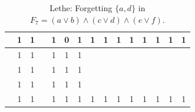 \begin{table}[!tb]
\begin{tabular}{|c|c|c|c|c|c|c|c|c|c|c|c|c|c|c|}
        \rowcolor{yellow!40}  & 1 & 1 &  & 1 & 0 & 1 & 1 & 1 & 1 & 1 & 1 & 1 & 1 & 1 \\ \hline
        \rowcolor{gray!40}  & 1 & 1 &  & 1 & 1 & 1 &  &  &  &  &  &  &  &  \\ \hline
        \rowcolor{gray!40}  & 1 & 1 &  & 1 & 1 & 1 &  &  &  &  &  &  &  &  \\ \hline
        \rowcolor{gray!40}  & 1 & 1 &  & 1 & 1 & 1 &  &  &  &  &  &  &  &  \\ \hline
        \rowcolor{gray!40}  & 1 & 1 &  & 1 & 1 & 1 & 1 & 1 & 1 & 1 & 1 & 1 & 1 & 1 \\ \hline
    \end{tabular}
    \caption{Lethe: Forgetting $\{a, d\}$ in $F_{7} = (a \lor b) \land (c \lor d) \land (e \lor f)$.}
    \label{tab:lethe-F7-ad}
\end{table}
